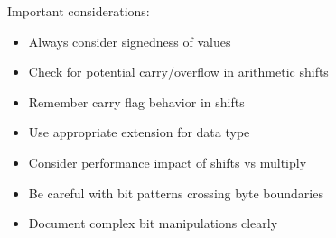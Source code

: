 \raggedcolumns

\begin{remark}
Important considerations:
\begin{itemize}
  \item Always consider signedness of values
  \item Check for potential carry/overflow in arithmetic shifts
  \item Remember carry flag behavior in shifts
  \item Use appropriate extension for data type
  \item Consider performance impact of shifts vs multiply
  \item Be careful with bit patterns crossing byte boundaries
  \item Document complex bit manipulations clearly
\end{itemize}
\end{remark}



